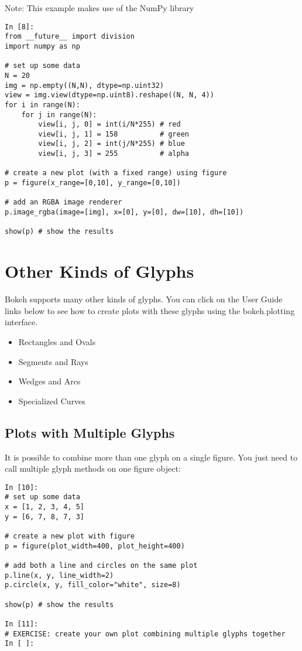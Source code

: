 Note: This example makes use of the NumPy library
\begin{framed}
	\begin{verbatim}
In [8]:
from __future__ import division
import numpy as np

# set up some data
N = 20
img = np.empty((N,N), dtype=np.uint32)
view = img.view(dtype=np.uint8).reshape((N, N, 4))
for i in range(N):
    for j in range(N):
        view[i, j, 0] = int(i/N*255) # red
        view[i, j, 1] = 158          # green
        view[i, j, 2] = int(j/N*255) # blue
        view[i, j, 3] = 255          # alpha
        
# create a new plot (with a fixed range) using figure
p = figure(x_range=[0,10], y_range=[0,10])

# add an RGBA image renderer
p.image_rgba(image=[img], x=[0], y=[0], dw=[10], dh=[10])

show(p) # show the results
\end{verbatim}
\end{framed}
\section{Other Kinds of Glyphs}
Bokeh supports many other kinds of glyphs. You can click on the User Guide links below to see how to create plots with these glyphs using the bokeh.plotting interface.

\begin{itemize}
\item Rectangles and Ovals
\item Segments and Rays
\item Wedges and Arcs
\item Specialized Curves
\end{itemize}

\subsection{Plots with Multiple Glyphs}
It is possible to combine more than one glyph on a single figure. You just need to call multiple glyph methods on one figure object:
\begin{framed}
	\begin{verbatim}
In [10]:
# set up some data
x = [1, 2, 3, 4, 5]
y = [6, 7, 8, 7, 3]

# create a new plot with figure
p = figure(plot_width=400, plot_height=400)

# add both a line and circles on the same plot
p.line(x, y, line_width=2)
p.circle(x, y, fill_color="white", size=8)

show(p) # show the results
	
In [11]:
# EXERCISE: create your own plot combining multiple glyphs together
In [ ]:
\end{verbatim}
\end{framed}
 
%
%
%
%
%
